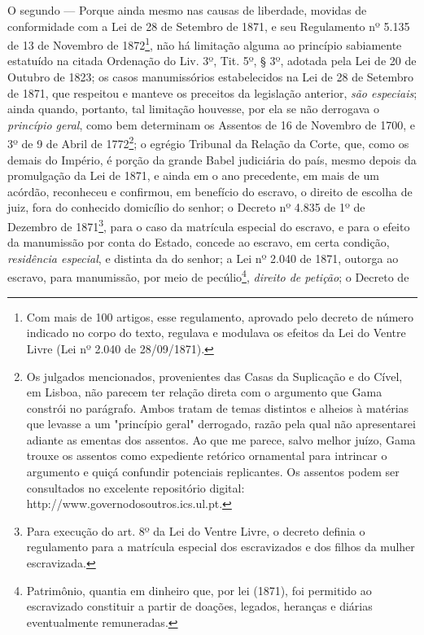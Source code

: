 O segundo --- Porque ainda mesmo nas causas de liberdade, movidas de
conformidade com a Lei de 28 de Setembro de 1871, e seu Regulamento nº
5.135 de 13 de Novembro de 1872\footnote{Com mais de 100 artigos, esse
  regulamento, aprovado pelo decreto de número indicado no corpo do
  texto, regulava e modulava os efeitos da Lei do Ventre Livre (Lei nº
  2.040 de 28/09/1871).}, não há limitação alguma ao princípio
sabiamente estatuído na citada Ordenação do Liv. 3º, Tit. 5º, § 3º,
adotada pela Lei de 20 de Outubro de 1823; os casos manumissórios
estabelecidos na Lei de 28 de Setembro de 1871, que respeitou e manteve
os preceitos da legislação anterior, \emph{são especiais}; ainda quando,
portanto, tal limitação houvesse, por ela se não derrogava o
\emph{princípio geral}, como bem determinam os Assentos de 16 de
Novembro de 1700, e 3º de 9 de Abril de 1772\footnote{Os julgados
  mencionados, provenientes das Casas da Suplicação e do Cível, em
  Lisboa, não parecem ter relação direta com o argumento que Gama
  constrói no parágrafo. Ambos tratam de temas distintos e alheios à
  matérias que levasse a um "princípio geral" derrogado, razão pela qual
  não apresentarei adiante as ementas dos assentos. Ao que me parece,
  salvo melhor juízo, Gama trouxe os assentos como expediente retórico
  ornamental para intrincar o argumento e quiçá confundir potenciais
  replicantes. Os assentos podem ser consultados no excelente
  repositório digital: http://www.governodosoutros.ics.ul.pt.}; o
egrégio Tribunal da Relação da Corte, que, como os demais do Império, é
porção da grande Babel judiciária do país, mesmo depois da promulgação
da Lei de 1871, e ainda em o ano precedente, em mais de um acórdão,
reconheceu e confirmou, em benefício do escravo, o direito de escolha de
juiz, fora do conhecido domicílio do senhor; o Decreto nº 4.835 de 1º de
Dezembro de 1871\footnote{Para execução do art. 8º da Lei do Ventre
  Livre, o decreto definia o regulamento para a matrícula especial dos
  escravizados e dos filhos da mulher escravizada.}, para o caso da
matrícula especial do escravo, e para o efeito da manumissão por conta
do Estado, concede ao escravo, em certa condição, \emph{residência
especial}, e distinta da do senhor; a Lei nº 2.040 de 1871, outorga ao
escravo, para manumissão, por meio de pecúlio\footnote{Patrimônio,
  quantia em dinheiro que, por lei (1871), foi permitido ao escravizado
  constituir a partir de doações, legados, heranças e diárias
  eventualmente remuneradas.}, \emph{direito de petição}; o Decreto de
